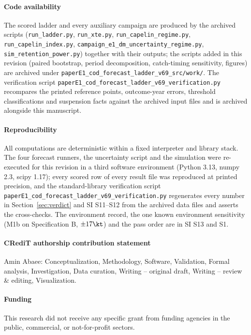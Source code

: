 \paragraph{Code availability} The scored ladder and every auxiliary campaign are produced by the archived scripts (\texttt{run\_ladder.py}, \texttt{run\_xte.py}, \texttt{run\_capelin\_regime.py}, \texttt{run\_capelin\_index.py}, \texttt{campaign\_e1\_dm\_uncertainty\_regime.py}, \texttt{sim\_retention\_power.py}) together with their outputs; the scripts added in this revision (paired bootstrap, period decomposition, catch-timing sensitivity, figures) are archived under \texttt{paperE1\_cod\_forecast\_ladder\_v69\_src/work/}. The verification script \texttt{paperE1\_cod\_forecast\_ladder\_v69\_verification.py} recompares the printed reference points, outcome-year errors, threshold classifications and suspension facts against the archived input files and is archived alongside this manuscript.

\paragraph{Reproducibility} All computations are deterministic within a fixed interpreter and library stack. The four forecast runners, the uncertainty script and the simulation were re-executed for this revision in a third software environment (Python 3.13, numpy 2.3, scipy 1.17); every scored row of every result file was reproduced at printed precision, and the standard-library verification script \texttt{paperE1\_cod\_forecast\_ladder\_v69\_verification.py} regenerates every number in Section~\ref{sec:verdict} and SI S11--S12 from the archived data files and asserts the cross-checks. The environment record, the one known environment sensitivity (M1b on Specification B, $\pm17\kt$) and the pass order are in SI S13 and S1.

\paragraph{CRediT authorship contribution statement} Amin Abaee: Conceptualization, Methodology, Software, Validation, Formal analysis, Investigation, Data curation, Writing -- original draft, Writing -- review \& editing, Visualization.

\paragraph{Funding} This research did not receive any specific grant from funding agencies in the public, commercial, or not-for-profit sectors.

